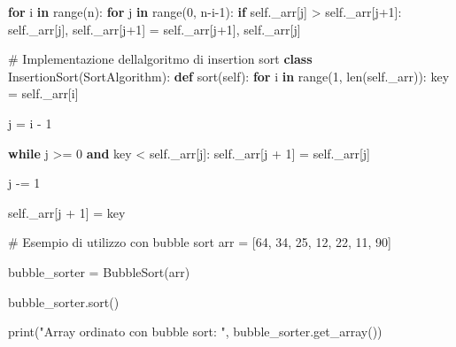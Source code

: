 \documentclass[
  letterpaper,
]{scrbook}
\newenvironment{Shaded}{\begin{snugshade}}{\end{snugshade}}
\newcommand{\BuiltInTok}[1]{\textcolor[rgb]{0.00,0.23,0.31}{#1}}
\newcommand{\CommentTok}[1]{\textcolor[rgb]{0.37,0.37,0.37}{#1}}
\newcommand{\ControlFlowTok}[1]{\textcolor[rgb]{0.00,0.23,0.31}{\textbf{#1}}}
\newcommand{\DecValTok}[1]{\textcolor[rgb]{0.68,0.00,0.00}{#1}}
\newcommand{\KeywordTok}[1]{\textcolor[rgb]{0.00,0.23,0.31}{\textbf{#1}}}
\newcommand{\NormalTok}[1]{\textcolor[rgb]{0.00,0.23,0.31}{#1}}
\newcommand{\OperatorTok}[1]{\textcolor[rgb]{0.37,0.37,0.37}{#1}}
\newcommand{\StringTok}[1]{\textcolor[rgb]{0.13,0.47,0.30}{#1}}
\newcommand{\VariableTok}[1]{\textcolor[rgb]{0.07,0.07,0.07}{#1}}
\begin{document}
\begin{itemize}
\begin{Shaded}
\begin{Highlighting}[]
    \ControlFlowTok{for}\NormalTok{ i }\KeywordTok{in} \BuiltInTok{range}\NormalTok{(n):}
      \ControlFlowTok{for}\NormalTok{ j }\KeywordTok{in} \BuiltInTok{range}\NormalTok{(}\DecValTok{0}\NormalTok{, n}\OperatorTok{{-}}\NormalTok{i}\OperatorTok{{-}}\DecValTok{1}\NormalTok{):}
        \ControlFlowTok{if} \VariableTok{self}\NormalTok{.\_arr[j] }\OperatorTok{\textgreater{}} \VariableTok{self}\NormalTok{.\_arr[j}\OperatorTok{+}\DecValTok{1}\NormalTok{]:}
          \VariableTok{self}\NormalTok{.\_arr[j], }\VariableTok{self}\NormalTok{.\_arr[j}\OperatorTok{+}\DecValTok{1}\NormalTok{] }\OperatorTok{=} \VariableTok{self}\NormalTok{.\_arr[j}\OperatorTok{+}\DecValTok{1}\NormalTok{], }\VariableTok{self}\NormalTok{.\_arr[j]}

\CommentTok{\# Implementazione dell\textquotesingle{}algoritmo di insertion sort}
\KeywordTok{class}\NormalTok{ InsertionSort(SortAlgorithm):}
  \KeywordTok{def}\NormalTok{ sort(}\VariableTok{self}\NormalTok{):}
    \ControlFlowTok{for}\NormalTok{ i }\KeywordTok{in} \BuiltInTok{range}\NormalTok{(}\DecValTok{1}\NormalTok{, }\BuiltInTok{len}\NormalTok{(}\VariableTok{self}\NormalTok{.\_arr)):}
\NormalTok{      key }\OperatorTok{=} \VariableTok{self}\NormalTok{.\_arr[i]}

\NormalTok{      j }\OperatorTok{=}\NormalTok{ i }\OperatorTok{{-}} \DecValTok{1}

      \ControlFlowTok{while}\NormalTok{ j }\OperatorTok{\textgreater{}=} \DecValTok{0} \KeywordTok{and}\NormalTok{ key }\OperatorTok{\textless{}} \VariableTok{self}\NormalTok{.\_arr[j]:}
        \VariableTok{self}\NormalTok{.\_arr[j }\OperatorTok{+} \DecValTok{1}\NormalTok{] }\OperatorTok{=} \VariableTok{self}\NormalTok{.\_arr[j]}

\NormalTok{        j }\OperatorTok{{-}=} \DecValTok{1}

      \VariableTok{self}\NormalTok{.\_arr[j }\OperatorTok{+} \DecValTok{1}\NormalTok{] }\OperatorTok{=}\NormalTok{ key}

\CommentTok{\# Esempio di utilizzo con bubble sort}
\NormalTok{arr }\OperatorTok{=}\NormalTok{ [}\DecValTok{64}\NormalTok{, }\DecValTok{34}\NormalTok{, }\DecValTok{25}\NormalTok{, }\DecValTok{12}\NormalTok{, }\DecValTok{22}\NormalTok{, }\DecValTok{11}\NormalTok{, }\DecValTok{90}\NormalTok{]}

\NormalTok{bubble\_sorter }\OperatorTok{=}\NormalTok{ BubbleSort(arr)}

\NormalTok{bubble\_sorter.sort()}

\BuiltInTok{print}\NormalTok{(}\StringTok{"Array ordinato con bubble sort: "}\NormalTok{, bubble\_sorter.get\_array())}


\end{Highlighting}
\end{Shaded}
\end{itemize}
\end{document}
